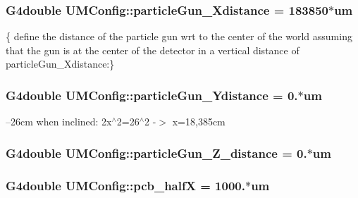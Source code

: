 \subsubsection[{particle\+Gun\+\_\+\+Xdistance}]{\setlength{\rightskip}{0pt plus 5cm}G4double U\+M\+Config\+::particle\+Gun\+\_\+\+Xdistance = 183850$\ast$um}\label{structUMConfig_aefea0e00593d3272310b5f9918c411b3}


\{ define the distance of the particle gun wrt to the center of the world assuming that the gun is at the center of the detector in a vertical distance of particle\+Gun\+\_\+\+Xdistance\+:\} 

\hypertarget{structUMConfig_acd052d2268fad88072f04522ebe2ad57}{}
\subsubsection[{particle\+Gun\+\_\+\+Ydistance}]{\setlength{\rightskip}{0pt plus 5cm}G4double U\+M\+Config\+::particle\+Gun\+\_\+\+Ydistance = 0.$\ast$um}\label{structUMConfig_acd052d2268fad88072f04522ebe2ad57}


--26cm when inclined\+: 2x$^\wedge$2=26$^\wedge$2 -\/$>$ x=18,385cm 

\hypertarget{structUMConfig_ac9812c1f908fee8386d07ef47c360dbb}{}
\subsubsection[{particle\+Gun\+\_\+\+Z\+\_\+distance}]{\setlength{\rightskip}{0pt plus 5cm}G4double U\+M\+Config\+::particle\+Gun\+\_\+\+Z\+\_\+distance = 0.$\ast$um}\label{structUMConfig_ac9812c1f908fee8386d07ef47c360dbb}
\hypertarget{structUMConfig_a89f67c198c9542cc4421a2dc60c52b36}{}
\subsubsection[{pcb\+\_\+half\+X}]{\setlength{\rightskip}{0pt plus 5cm}G4double U\+M\+Config\+::pcb\+\_\+half\+X = 1000.$\ast$um}\label{structUMConfig_a89f67c198c9542cc4421a2dc60c52b36}
\hypertarget{structUMConfig_a6c1fe8140f1fd3613eb3d4b1f77ca13e}{}
